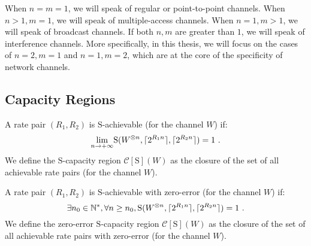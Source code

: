 When $n=m=1$, we will speak of regular or point-to-point channels. When $n>1,m=1$, we will speak of multiple-access channels. When $n=1,m>1$, we will speak of broadcast channels. If both $n,m$ are greater than $1$, we will speak of interference channels. More specifically, in this thesis, we will focus on the cases of $n=2,m=1$ and $n=1,m=2$, which are at the core of the specificity of network channels.

\subsection{Capacity Regions}
\begin{definition}
  \label{defi:generalCapacityRegion}
  A rate pair $(R_1,R_2)$ is $\mathrm{S}$-achievable (for the channel $W$) if:
  \[ \underset{n \rightarrow +\infty}{\lim} \mathrm{S}(W^{\otimes n},\ceil{2^{R_1n}},\ceil{2^{R_2n}}) = 1 \ . \]
  We define the $\mathrm{S}$-capacity region $\mathcal{C}[\mathrm{S}](W)$ as the closure of the set of all achievable rate pairs (for the channel $W$).
\end{definition}

\begin{definition}
  A rate pair $(R_1,R_2)$ is $\mathrm{S}$-achievable with zero-error (for the channel $W$) if:
  \[ \exists n_0  \in \mathbb{N}^*, \forall n \geq n_0, \mathrm{S}(W^{\otimes n},\lceil2^{R_1n}\rceil,\lceil2^{R_2n}\rceil) = 1 \ . \]
  We define the zero-error $\mathrm{S}$-capacity region $\mathcal{C}[\mathrm{S}](W)$ as the closure of the set of all achievable rate pairs with zero-error (for the channel $W$).
\end{definition}

